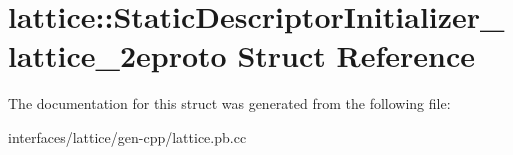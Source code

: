 \hypertarget{structlattice_1_1StaticDescriptorInitializer__lattice__2eproto}{
\section{lattice::StaticDescriptorInitializer\_\-lattice\_\-2eproto Struct Reference}
\label{structlattice_1_1StaticDescriptorInitializer__lattice__2eproto}
}


The documentation for this struct was generated from the following file:\begin{DoxyCompactItemize}
\item 
interfaces/lattice/gen-\/cpp/lattice.pb.cc\end{DoxyCompactItemize}
